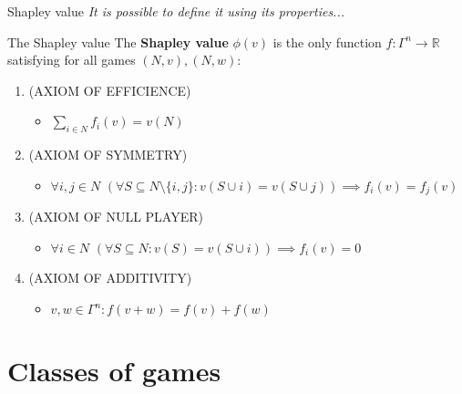 \documentclass{beamer}
\begin{document}
\begin{frame}{Shapley value}
    \textit{It is possible to define it using its properties...}
    \begin{block}{The Shapley value}
       The \textbf{Shapley value} $\phi(v)$ is the only function $f \colon \Gamma^n \to \mathbb{R}$ satisfying for all games $(N,v),(N,w)$:
        \begin{enumerate}
            \item (AXIOM OF EFFICIENCE)
            \begin{itemize}
                \item $\sum_{i \in N}f_i(v) = v(N)$
            \end{itemize}
            \item (AXIOM OF SYMMETRY)
            \begin{itemize}
                \item $\forall i,j \in N$ $(\forall S \subseteq N \setminus \{i,j\}: v(S \cup i) = v(S \cup j)) \implies f_i(v) = f_j(v)$
            \end{itemize}
            \item (AXIOM OF NULL PLAYER)
            \begin{itemize}
                \item $\forall i \in N$ $(\forall S \subseteq N: v(S) = v(S \cup i)) \implies f_i(v)=0$
            \end{itemize}
            \item (AXIOM OF ADDITIVITY)
            \begin{itemize}
                \item $v,w \in \Gamma^n: f(v+w)=f(v)+f(w)$
            \end{itemize}
        \end{enumerate}
        
    \end{block}
\end{frame}



\section{Classes of games}

\end{document}
